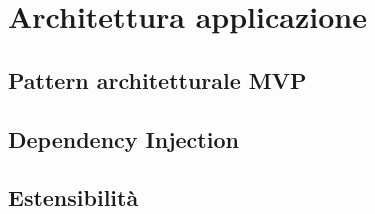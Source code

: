 \documentclass[../ManualeSviluppatore.tex]{subfiles}
\begin{document}
\section{Architettura applicazione}

	\subsection{Pattern architetturale MVP}
	
	\subsection{Dependency Injection}
	
	\subsection{Estensibilità}
\end{document}
